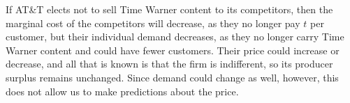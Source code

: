 \documentclass[12pt]{paper}
\begin{document}
If AT\&T elects not to sell Time Warner content to its competitors,
then the marginal cost of the competitors will decrease, as they no
longer pay $t$ per customer, but their individual demand decreases, as
they no longer carry Time Warner content and could have fewer
customers. Their price could increase or decrease, and all that is
known is that the firm is indifferent, so its producer surplus remains
unchanged. Since demand could change as well, however, this does not
allow us to make predictions about the price.





\end{document}
